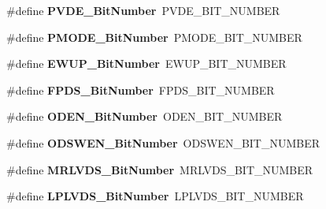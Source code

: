 \begin{DoxyCompactItemize}
\item 
\#define {\bfseries P\+V\+D\+E\+\_\+\+Bit\+Number}~P\+V\+D\+E\+\_\+\+B\+I\+T\+\_\+\+N\+U\+M\+B\+ER\hypertarget{group___h_a_l___p_w_r___aliased_ga17d618eb800c401ef9c6789c9374eaf8}{}\label{group___h_a_l___p_w_r___aliased_ga17d618eb800c401ef9c6789c9374eaf8}

\item 
\#define {\bfseries P\+M\+O\+D\+E\+\_\+\+Bit\+Number}~P\+M\+O\+D\+E\+\_\+\+B\+I\+T\+\_\+\+N\+U\+M\+B\+ER\hypertarget{group___h_a_l___p_w_r___aliased_ga15fea9df1b0d324394336f70b319b377}{}\label{group___h_a_l___p_w_r___aliased_ga15fea9df1b0d324394336f70b319b377}

\item 
\#define {\bfseries E\+W\+U\+P\+\_\+\+Bit\+Number}~E\+W\+U\+P\+\_\+\+B\+I\+T\+\_\+\+N\+U\+M\+B\+ER\hypertarget{group___h_a_l___p_w_r___aliased_ga94fe0520e8f9b71fa2b99c0565ec70ea}{}\label{group___h_a_l___p_w_r___aliased_ga94fe0520e8f9b71fa2b99c0565ec70ea}

\item 
\#define {\bfseries F\+P\+D\+S\+\_\+\+Bit\+Number}~F\+P\+D\+S\+\_\+\+B\+I\+T\+\_\+\+N\+U\+M\+B\+ER\hypertarget{group___h_a_l___p_w_r___aliased_gad99a3da921e3e64587f6b9505ecba665}{}\label{group___h_a_l___p_w_r___aliased_gad99a3da921e3e64587f6b9505ecba665}

\item 
\#define {\bfseries O\+D\+E\+N\+\_\+\+Bit\+Number}~O\+D\+E\+N\+\_\+\+B\+I\+T\+\_\+\+N\+U\+M\+B\+ER\hypertarget{group___h_a_l___p_w_r___aliased_ga2f24ddbcbc5b8d74c0b032cfa53c725a}{}\label{group___h_a_l___p_w_r___aliased_ga2f24ddbcbc5b8d74c0b032cfa53c725a}

\item 
\#define {\bfseries O\+D\+S\+W\+E\+N\+\_\+\+Bit\+Number}~O\+D\+S\+W\+E\+N\+\_\+\+B\+I\+T\+\_\+\+N\+U\+M\+B\+ER\hypertarget{group___h_a_l___p_w_r___aliased_gaf2e21cacf95f557d2535d623c41577c2}{}\label{group___h_a_l___p_w_r___aliased_gaf2e21cacf95f557d2535d623c41577c2}

\item 
\#define {\bfseries M\+R\+L\+V\+D\+S\+\_\+\+Bit\+Number}~M\+R\+L\+V\+D\+S\+\_\+\+B\+I\+T\+\_\+\+N\+U\+M\+B\+ER\hypertarget{group___h_a_l___p_w_r___aliased_ga50e53827046644c175fe431eea5f4261}{}\label{group___h_a_l___p_w_r___aliased_ga50e53827046644c175fe431eea5f4261}

\item 
\#define {\bfseries L\+P\+L\+V\+D\+S\+\_\+\+Bit\+Number}~L\+P\+L\+V\+D\+S\+\_\+\+B\+I\+T\+\_\+\+N\+U\+M\+B\+ER\hypertarget{group___h_a_l___p_w_r___aliased_ga7ebe7d965ce7638645ee9a5e35c01be7}{}\label{group___h_a_l___p_w_r___aliased_ga7ebe7d965ce7638645ee9a5e35c01be7}


\end{DoxyCompactItemize}

